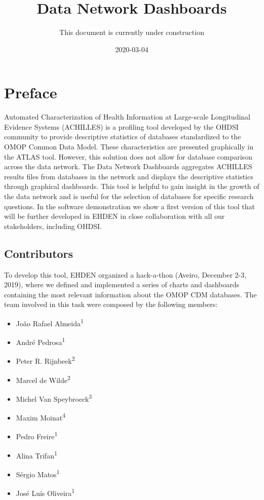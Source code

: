 \documentclass[]{book}
\title{Data Network Dashboards}
\author{This document is currently under construction}
\date{2020-03-04}
\providecommand{\tightlist}{%
  \setlength{\itemsep}{0pt}\setlength{\parskip}{0pt}}
\begin{document}
\maketitle

{
\setcounter{tocdepth}{1}
\tableofcontents
}
\chapter*{Preface}\label{preface}

Automated Characterization of Health Information at Large-scale
Longitudinal Evidence Systems (ACHILLES) is a profiling tool developed
by the OHDSI community to provide descriptive statistics of databases
standardized to the OMOP Common Data Model. These characteristics are
presented graphically in the ATLAS tool. However, this solution does not
allow for database comparison across the data network. The Data Network
Dashboards aggregates ACHILLES results files from databases in the
network and displays the descriptive statistics through graphical
dashboards. This tool is helpful to gain insight in the growth of the
data network and is useful for the selection of databases for specific
research questions. In the software demonstration we show a first
version of this tool that will be further developed in EHDEN in close
collaboration with all our stakeholders, including OHDSI.

\section*{Contributors}\label{contributors}

To develop this tool, EHDEN organized a hack-a-thon (Aveiro, December
2-3, 2019), where we defined and implemented a series of charts and
dashboards containing the most relevant information about the OMOP CDM
databases. The team involved in this task were composed by the following
members:

\begin{itemize}
\tightlist
\item
  João Rafael Almeida\textsuperscript{1}
\item
  André Pedrosa\textsuperscript{1}
\item
  Peter R. Rijnbeek\textsuperscript{2}
\item
  Marcel de Wilde\textsuperscript{2}
\item
  Michel Van Speybroeck\textsuperscript{3}
\item
  Maxim Moinat\textsuperscript{4}
\item
  Pedro Freire\textsuperscript{1}
\item
  Alina Trifan\textsuperscript{1}
\item
  Sérgio Matos\textsuperscript{1}
\item
  José Luís Oliveira\textsuperscript{1}
\end{itemize}
\end{document}
